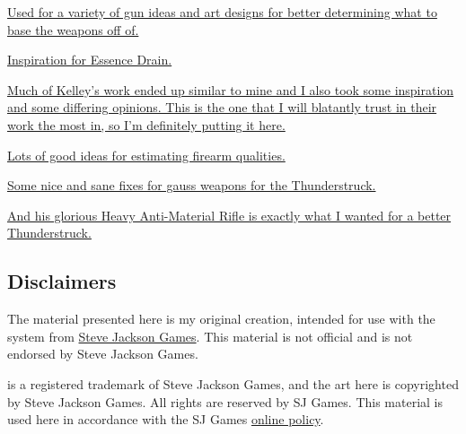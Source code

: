 \begin{multicols*}{2}
	\href{http://www.ambient.ca/cpunk/shadowguns/subguns.html}{Used for a variety of gun ideas and art designs for better determining what to base the weapons off of.}
	
	\href{http://forums.sjgames.com/showthread.php?t=152300}{Inspiration for Essence Drain.}
	
	\href{http://forums.sjgames.com/showpost.php?p=507199&postcount=8}{Much of Kelley's work ended up similar to mine and I also took some inspiration and some differing opinions. This is the one that I will blatantly trust in their work the most in, so I'm definitely putting it here.}
	
	\href{http://gurb3d6.blogspot.com/2017/01/ultra-tech-quickie-more-blaster-and.html}{Lots of good ideas for estimating firearm qualities.}
	
	\href{http://gurb3d6.blogspot.com/2017/05/gauss-weapons-reloaded.html}{Some nice and sane fixes for gauss weapons for the Thunderstruck.}
	
	\href{http://gurb3d6.blogspot.com/2016/09/have-gauss-will-travel.html}{And his glorious Heavy Anti-Material Rifle is exactly what I wanted for a better Thunderstruck.}
	
	\subsection{Disclaimers}
	
	The material presented here is my original creation, intended for use with the \href{http://www.sjgames.com/gurps/}{\GURPS} system from \href{http://www.sjgames.com/}{Steve Jackson Games}. This material is not official and is not endorsed by Steve Jackson Games.
	
	\href{http://www.sjgames.com/gurps/}{\GURPS} is a registered trademark of Steve Jackson Games, and the art here is copyrighted by Steve Jackson Games. All rights are reserved by SJ Games. This material is used here in accordance with the SJ Games \href{http://www.sjgames.com/general/online_policy.html}{online policy}.
	
\end{multicols*}